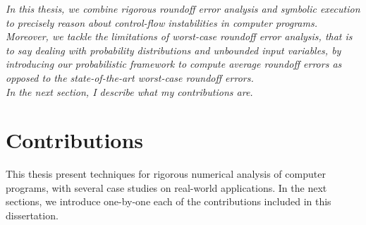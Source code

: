%
\emph{
%
%	
In this thesis, we combine rigorous roundoff error analysis and symbolic execution to precisely reason about control-flow instabilities in computer programs.
%
%
Moreover, we tackle the limitations of worst-case roundoff error analysis, that is to say dealing with probability distributions and unbounded input variables, by introducing our probabilistic framework to compute average roundoff errors as opposed to the state-of-the-art worst-case roundoff errors.
%
%
%
\\
In the next section, I describe what my contributions are.
}

%
%
%
%
\section{Contributions}
%
This thesis present techniques for rigorous numerical analysis of computer programs, with several case studies on real-world applications.
%
%
%
In the next sections, we introduce one-by-one each of the contributions included in this dissertation.
%

